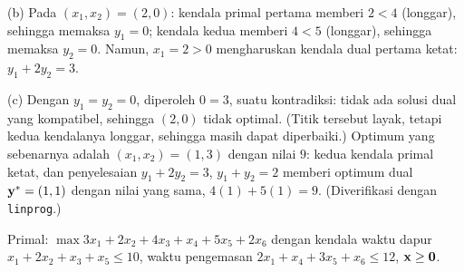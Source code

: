 (b) Pada $(x_1, x_2) = (2, 0)$: kendala primal pertama memberi $2 < 4$ (longgar), sehingga memaksa $y_1 = 0$; kendala kedua memberi $4 < 5$ (longgar), sehingga memaksa $y_2 = 0$. Namun, $x_1 = 2 > 0$ mengharuskan kendala dual pertama ketat: $y_1 + 2y_2 = 3$.

(c) Dengan $y_1 = y_2 = 0$, diperoleh $0 = 3$, suatu kontradiksi: tidak ada solusi dual yang kompatibel, sehingga $(2,0)$ tidak optimal. (Titik tersebut layak, tetapi kedua kendalanya longgar, sehingga masih dapat diperbaiki.) Optimum yang sebenarnya adalah $(x_1, x_2) = (1, 3)$ dengan nilai $9$: kedua kendala primal ketat, dan penyelesaian $y_1 + 2y_2 = 3$, $y_1 + y_2 = 2$ memberi optimum dual $\mathbf{y}^* = (1,1)$ dengan nilai yang sama, $4(1) + 5(1) = 9$. (Diverifikasi dengan \texttt{linprog}.)


Primal: $\max 3x_1 + 2x_2 + 4x_3 + x_4 + 5x_5 + 2x_6$ dengan kendala waktu dapur $x_1 + 2x_2 + x_3 + x_5 \le 10$, waktu pengemasan $2x_1 + x_4 + 3x_5 + x_6 \le 12$, $\mathbf{x} \ge \mathbf{0}$.

